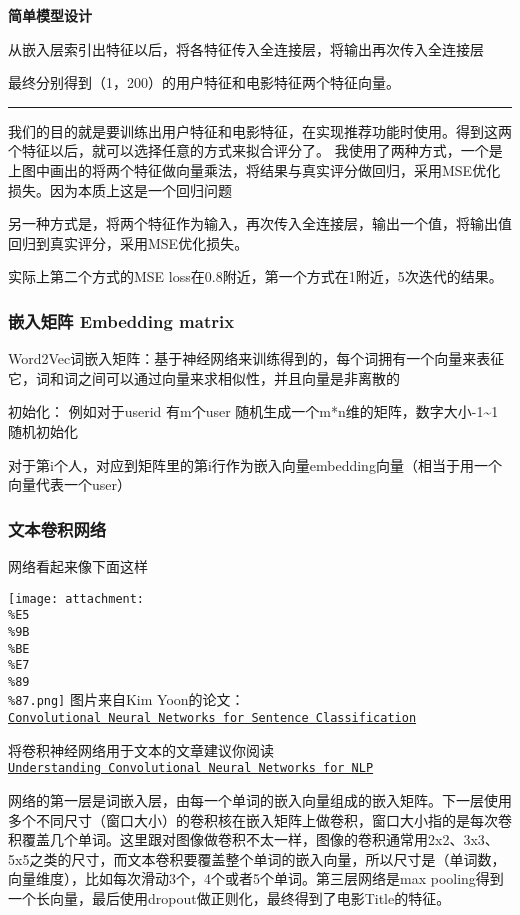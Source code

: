 \documentclass[11pt]{article}
\makeatletter
\def\maxwidth{\ifdim\Gin@nat@width>\linewidth\linewidth
    \else\Gin@nat@width\fi}
\let\Oldincludegraphics\includegraphics
\renewcommand{\includegraphics}[1]{\Oldincludegraphics[width=.8\maxwidth]{#1}}
\makeatother
\begin{document}
\textbf{简单模型设计}

从嵌入层索引出特征以后，将各特征传入全连接层，将输出再次传入全连接层

最终分别得到（1，200）的用户特征和电影特征两个特征向量。

\begin{center}\rule{0.5\linewidth}{\linethickness}\end{center}

我们的目的就是要训练出用户特征和电影特征，在实现推荐功能时使用。得到这两个特征以后，就可以选择任意的方式来拟合评分了。
我使用了两种方式，一个是上图中画出的将两个特征做向量乘法，将结果与真实评分做回归，采用MSE优化损失。因为本质上这是一个回归问题

另一种方式是，将两个特征作为输入，再次传入全连接层，输出一个值，将输出值回归到真实评分，采用MSE优化损失。

实际上第二个方式的MSE loss在0.8附近，第一个方式在1附近，5次迭代的结果。

    \subsubsection{嵌入矩阵 Embedding
matrix}\label{ux5d4cux5165ux77e9ux9635-embedding-matrix}

Word2Vec词嵌入矩阵：基于神经网络来训练得到的，每个词拥有一个向量来表征它，词和词之间可以通过向量来求相似性，并且向量是非离散的

初始化： 例如对于userid 有m个user
随机生成一个m*n维的矩阵，数字大小-1\textasciitilde{}1随机初始化

对于第i个人，对应到矩阵里的第i行作为嵌入向量embedding向量（相当于用一个向量代表一个user）

    \subsubsection{文本卷积网络}\label{ux6587ux672cux5377ux79efux7f51ux7edc}

网络看起来像下面这样

    \texttt{[image: attachment:\\\%E5\\\%9B\\\%BE\\\%E7\\\%89\\\%87.png]} 图片来自Kim
Yoon的论文：\href{https://arxiv.org/abs/1408.5882}{\texttt{Convolutional\ Neural\ Networks\ for\ Sentence\ Classification}}

将卷积神经网络用于文本的文章建议你阅读\href{http://www.wildml.com/2015/11/understanding-convolutional-neural-networks-for-nlp/}{\texttt{Understanding\ Convolutional\ Neural\ Networks\ for\ NLP}}

    网络的第一层是词嵌入层，由每一个单词的嵌入向量组成的嵌入矩阵。下一层使用多个不同尺寸（窗口大小）的卷积核在嵌入矩阵上做卷积，窗口大小指的是每次卷积覆盖几个单词。这里跟对图像做卷积不太一样，图像的卷积通常用2x2、3x3、5x5之类的尺寸，而文本卷积要覆盖整个单词的嵌入向量，所以尺寸是（单词数，向量维度），比如每次滑动3个，4个或者5个单词。第三层网络是max
pooling得到一个长向量，最后使用dropout做正则化，最终得到了电影Title的特征。
\end{document}
